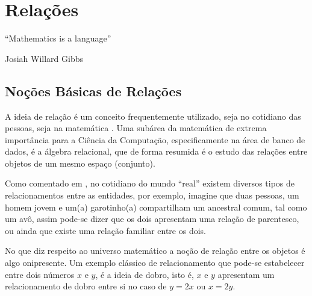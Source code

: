 \chapter{Relações}\label{cap:Relacoes}




\epigraph{``Mathematics is a language''}{Josiah Willard Gibbs}

\section{Noções Básicas de Relações}\label{sec:RelacaoParOdenado}

A ideia de relação é um conceito frequentemente utilizado, seja no cotidiano das pessoas, seja na matemática \cite{barreto1998}. Uma subárea da matemática de extrema importância para a Ciência da Computação, especificamente na área de banco de dados, é a álgebra relacional, que de forma resumida é o estudo das relações entre objetos de um mesmo espaço (conjunto). 

Como comentado em \cite{sussana2010-MD}, no cotidiano do mundo ``real'' existem diversos tipos de relacionamentos entre as entidades, por exemplo, imagine que duas pessoas, um homem jovem e um(a) garotinho(a) compartilham um ancestral comum, tal como um avô, assim pode-se dizer que os dois apresentam uma relação de parentesco, ou ainda que existe uma relação familiar entre os dois.  

No que diz respeito ao universo matemático a noção de relação entre os objetos é algo onipresente. Um exemplo clássico de relacionamento que pode-se estabelecer entre dois números $x$ e $y$, é a ideia de dobro, isto é, $x$ e $y$ apresentam um relacionamento de dobro entre si no caso de $y = 2x$ ou $x = 2y$.

